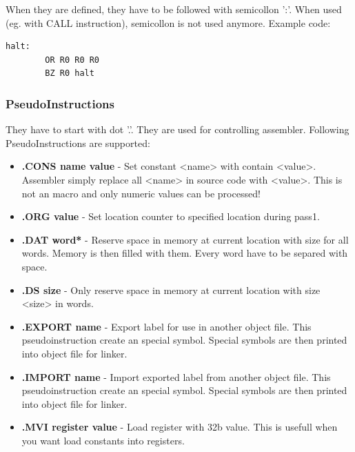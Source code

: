 When they are defined, they have to be followed with semicollon ':'. When used
(eg. with CALL instruction), semicollon is not used anymore. Example code:

\begin{lstlisting}[language={[x86masm]Assembler}, frame=single]
    halt:
        OR R0 R0 R0
        BZ R0 halt
\end{lstlisting}

\subsubsection{PseudoInstructions}

They have to start with dot '.'. They are used for controlling assembler. Following
PseudoInstructions are supported:

\begin{itemize}
    \item \textbf{.CONS name value} -
    Set constant <name> with contain <value>. Assembler simply replace all
    <name> in source code with <value>. This is not an macro and only numeric
    values can be processed!

    \item \textbf{.ORG value} -
    Set location counter to specified location during pass1.

    \item \textbf{.DAT word*} -
    Reserve space in memory at current location with size for all words.
    Memory is then filled with them. Every word have to be separed with
    space.

    \item \textbf{.DS size} -
    Only reserve space in memory at current location with size <size> in words.

    \item \textbf{.EXPORT name} -
    Export label for use in another object file. This pseudoinstruction create
    an special symbol. Special symbols are then printed into object file for
    linker.

    \item \textbf{.IMPORT name} -
    Import exported label from another object file. This pseudoinstruction
    create an special symbol. Special symbols are then printed into object file
    for linker.

    \item \textbf{.MVI register value} -
    Load register with 32b value. This is usefull when you want load constants
    into registers.
\end{itemize}

